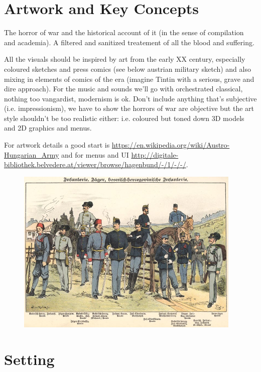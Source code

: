 \documentclass[a4paper, 11pt]{article}
\begin{document}
\pagestyle{fancy}
\setlength\parindent{0pt}
\setlength{\parskip}{1em}
\renewcommand{\baselinestretch}{1.5}

\section*{Artwork and Key Concepts}

The horror of war and the historical account of it (in the sense of compilation and academia). A filtered and sanitized treatement of all the blood and suffering.

All the visuals should be inspired by art from the early XX century, especially coloured sketches and press comics (see below austrian military sketch) and also mixing in elements of comics of the era (imagine Tintin with a serious, grave and dire approach). For the music and sounds we'll go with orchestrated classical, nothing too vangardist, modernism is ok. Don't include anything that's subjective (i.e. impressionism), we have to show the horrors of war are objective but the art style shouldn't be too realistic either: i.e. coloured but toned down 3D models and 2D graphics and menus.

For artwork details a good start is \url{https://en.wikipedia.org/wiki/Austro-Hungarian_Army} and for menus and UI \url{http://digitale-bibliothek.belvedere.at/viewer/browse/hagenbund/-/1/-/-/}.

\begin{figure}[h]
    \centering
	\includegraphics[keepaspectratio=true,width=\textwidth,height=300px]{austrian_infantry}
\end{figure}

\section*{Setting}
\end{document}
